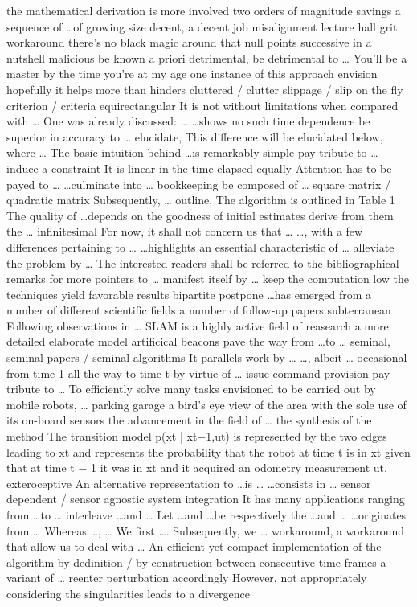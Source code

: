 \documentclass[12pt]{article}
\begin{document}
the mathematical derivation is more involved 
two orders of magnitude savings 
a sequence of \dots of growing size 
decent, a decent job 
misalignment 
lecture hall 
grit 
workaround 
there's no black magic around that 
null points 
successive 
in a nutshell 
malicious 
be known a priori 
detrimental, be detrimental to \dots 
You'll be a master by the time you're at my age 
one instance of this approach 
envision 
hopefully it helps more than hinders 
cluttered / clutter 
slippage / slip 
on the fly 
criterion / criteria 
equirectangular 
It is not without limitations when compared with \dots 
One was already discussed: \dots 
\dots shows no such time dependence 
be superior in accuracy to \dots 
elucidate, This difference will be elucidated below, where \dots 
The basic intuition behind \dots is remarkably simple 
pay tribute to \dots 
induce a constraint 
It is linear in the time elapsed 
equally 
Attention has to be payed to \dots 
\dots culminate into \dots 
bookkeeping 
be composed of \dots 
square matrix / quadratic matrix 
Subsequently, \dots 
outline, The algorithm is outlined in Table 1 
The quality of \dots depends on the goodness of initial estimates 
derive from them the \dots 
infinitesimal 
For now, it shall not concern us that \dots 
\dots, with a few  differences pertaining to \dots 
\dots highlights an essential characteristic of \dots 
alleviate the problem by \dots 
The interested readers shall be referred to the bibliographical remarks for more pointers to \dots 
manifest itself by \dots 
keep the computation low 
the techniques yield favorable results 
bipartite 
postpone 
\dots has emerged from a number of different scientific fields 
a number of follow-up papers 
subterranean 
Following observations in \dots 
SLAM is a highly active field of reasearch 
a more detailed elaborate model 
artificical beacons 
pave the way from \dots to \dots 
seminal, seminal papers / seminal algorithms 
It parallels work by \dots 
\dots, albeit \dots 
occasional 
from time 1 all the way to time t 
by virtue of \dots 
issue command 
provision 
pay tribute to \dots 
To efficiently solve many tasks envisioned to be carried out by mobile robots, \dots 
parking garage 
a bird's eye view of the area 
with the sole use of its on-board sensors 
the advancement in the field of \dots 
the synthesis of the method 
The transition model p(xt | xt−1,ut) is represented by the two edges leading to xt and represents the probability that the robot at time t is in xt given that at time t − 1 it was in xt and it acquired an odometry measurement ut. 
exteroceptive 
An alternative representation to \dots is \dots 
\dots consists in \dots 
sensor dependent / sensor agnostic 
system integration 
It has many applications ranging from \dots to \dots 
interleave \dots and \dots 
Let \dots and \dots be respectively the \dots and \dots 
\dots originates from \dots 
Whereas \dots, \dots 
We first \dots. Subsequently, we \dots 
workaround, a workaround that allow us to deal with \dots 
An efficient yet compact implementation of the algorithm 
by dedinition / by construction 
between consecutive time frames 
a variant of \dots 
reenter 
perturbation 
accordingly 
However, not appropriately considering the singularities leads to a divergence 
\end{document}
